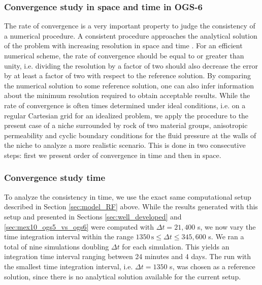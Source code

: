 \subsubsection{Convergence study in space and time in OGS-6}
The rate of convergence is a very important property to judge the consistency of a numerical procedure. A consistent procedure approaches the analytical solution of the problem with increasing resolution in space and time \cite{ferziger2012}.  For an efficient numerical scheme, the rate of convergence should be equal to or greater than unity, i.e. dividing the resolution by a factor of two should also decrease the error by at least a factor of two with respect to the reference solution. By comparing the numerical solution to some reference solution, one can also infer information about the minimum resolution required to obtain acceptable results. While the rate of convergence is often times determined under ideal conditions, i.e. on a regular Cartesian grid for an idealized problem, we apply the procedure to the present case of a niche surrounded by rock of two material groups, anisotropic permeability and cyclic boundary conditions for the fluid pressure at the walls of the niche to analyze a more realistic scenario. This is done in two consecutive steps: first we present order of convergence in time and then in space. 

\subsubsection*{Convergence study time}
To analyze the consistency in time, we use the exact same computational setup described in Section \ref{sec:model_RF} above. While the results generated with this setup and presented in Sections \ref{sec:well_developed} and \ref{sec:mex10_ogs5_vs_ogs6} were computed with $\Delta t = 21,400$ s, we now vary the time integration interval within the range $1350 \, \text{s} \leq \Delta t  \leq 345,600$ s. We ran a total of nine simulations doubling $\Delta t$ for each simulation. This yields an integration time interval ranging between 24 minutes and 4 days. The run with the smallest time integration interval, i.e. $\Delta t = 1350$ s, was chosen as a reference solution, since there is no analytical solution available for the current setup.

